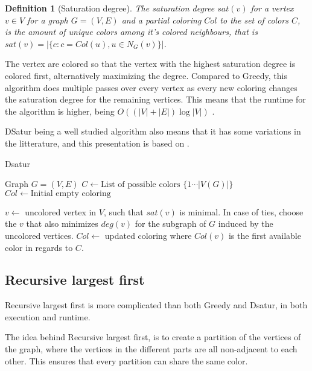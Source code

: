 \documentclass{amsart}
\newtheorem{definition}{Definition}[section]
\begin{document}
\begin{definition}[Saturation degree]
    The saturation degree $sat(v)$ for a vertex $v \in V$ for a graph $G =
    (V,E)$ and a partial coloring $Col$ to the set of colors $C$, is the amount of unique colors among
    it's colored neighbours, that is $sat(v) = |\{c  : c = Col(u), u \in N_G(v) \}|$.
\end{definition}

The vertex are colored so that the vertex with the highest saturation degree is
colored first, alternatively maximizing the degree. Compared to Greedy, this
algorithm does multiple passes over every vertex as every new coloring changes
the saturation degree for the remaining vertices. This means that the runtime
for the algorithm is higher, being
$O((|V|+|E|)\log{|V|})$ \cite{Constructive}.

DSatur being a well studied algorithm also means that it has some variations in 
the litterature, and this presentation is based on \cite{Constructive}.

\begin{algorithm}[H]
  \caption{Dsatur}
  \begin{algorithmic}[1]
      \REQUIRE Graph $G = (V,E)$
      \STATE $C \leftarrow \text{List of possible colors $\{1 \cdots |V(G)| \}$ }$
      \STATE $Col \leftarrow \text{Initial empty coloring}$


        \STATE $v \leftarrow$ uncolored vertex in $V$, such that $sat(v)$ is
        minimal. In case of ties, choose the $v$ that also minimizes $deg(v)$
        for the subgraph of $G$ induced by the uncolored vertices.
        \STATE $Col \leftarrow$ updated coloring where $Col(v)$ is the first
        available color in regards to $C$.
      \ENDFOR
  \end{algorithmic}
\end{algorithm}

\subsection{Recursive largest first}

Recursive largest first is more complicated than both Greedy and Dsatur, in both
execution and runtime. 

The idea behind Recursive largest first, is to create a partition of the
vertices of the graph, where the vertices in the different parts are all
non-adjacent to each other. This ensures that every partition can share the
same color. 
\end{document}
